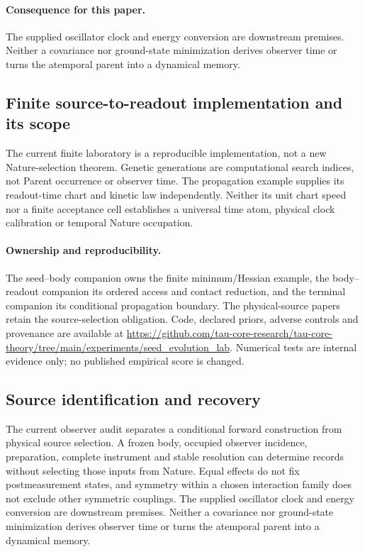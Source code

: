 \documentclass[11pt]{article}
\begin{document}
\paragraph{Consequence for this paper.}
The supplied oscillator clock and energy conversion are downstream premises. Neither a covariance nor ground-state minimization derives observer time or turns the atemporal parent into a dynamical memory.

\subsection{Finite source-to-readout implementation and its scope}
The current finite laboratory is a reproducible implementation, not a new Nature-selection theorem. Genetic generations are computational search indices, not Parent occurrence or observer time. The propagation example supplies its readout-time chart and kinetic law independently. Neither its unit chart speed nor a finite acceptance cell establishes a universal time atom, physical clock calibration or temporal Nature occupation.
\paragraph{Ownership and reproducibility.}
The seed--body companion owns the finite minimum/Hessian example, the body--readout companion its ordered access and contact reduction, and the terminal companion its conditional propagation boundary. The physical-source papers retain the source-selection obligation. Code, declared priors, adverse controls and provenance are available at \url{https://github.com/tau-core-research/tau-core-theory/tree/main/experiments/seed_evolution_lab}. Numerical tests are internal evidence only; no published empirical score is changed.

\subsection{Source identification and recovery}
The current observer audit separates a conditional forward construction from physical source selection. A frozen body, occupied observer incidence, preparation, complete instrument and stable resolution can determine records without selecting those inputs from Nature. Equal effects do not fix postmeasurement states, and symmetry within a chosen interaction family does not exclude other symmetric couplings. The supplied oscillator clock and energy conversion are downstream premises. Neither a covariance nor ground-state minimization derives observer time or turns the atemporal parent into a dynamical memory.
\end{document}
